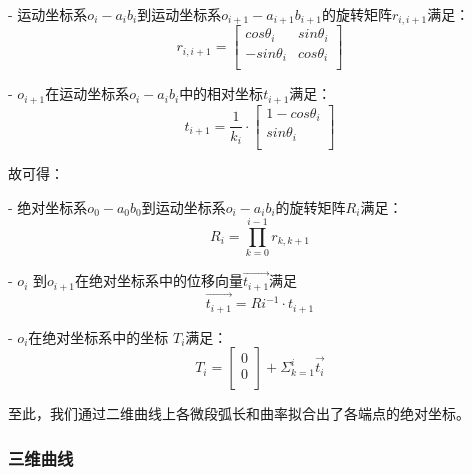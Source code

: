 - 运动坐标系$o_i-a_ib_i$到运动坐标系$o_{i+1}-a_{i+1}b_{i+1}$的旋转矩阵$r_{i, i+1}$满足：
    \begin{equation}
    r_{i, i+1} = \left[
      \begin{matrix}
      cos \theta_i & sin \theta_i\\
      -sin \theta_i & cos \theta_i\\
      \end{matrix}
    \right]
    \end{equation}
    
- $o_{i+1}$在运动坐标系$o_i-a_ib_i$中的相对坐标$t_{i+1}$满足：
    \begin{equation}
    t_{i+1} = \frac{1}{k_i} \cdot \left[
      \begin{matrix}
    	1 - cos\theta_i\\
      sin\theta_i\\
      \end{matrix}
    \right]
    \end{equation}
    

故可得：

- 绝对坐标系$o_0-a_0b_0$到运动坐标系$o_i-a_ib_i$的旋转矩阵$R_i$满足：
    \begin{equation}
    R_i = \prod_{k = 0}^{i-1} r_{k, k+1}
    \end{equation}

- $o_i$ 到$o_{i+1}$在绝对坐标系中的位移向量$\vec{t_{i+1}}$满足
    \begin{equation}
    \vec{t_{i+1}} = Ri^{-1}\cdot t_{i+1}
    \end{equation}
    
- $o_i$在绝对坐标系中的坐标 $T_i$满足：
    \begin{equation}
    T_i = \left[
    		\begin{matrix}
        0\\
        0\\
      	\end{matrix}
      \right]
      + \Sigma_{k=1} ^ {i} \vec{t_i}
    \end{equation}
    
至此，我们通过二维曲线上各微段弧长和曲率拟合出了各端点的绝对坐标。

\subsubsection{三维曲线}

\begin{center}
    
\end{center}


